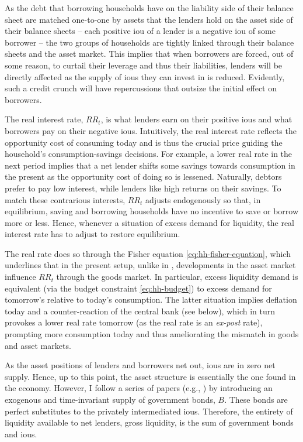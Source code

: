 \documentclass[a4paper,12pt]{article} %
\numberwithin{equation}{section} %
\numberwithin{figure}{section}
\numberwithin{table}{section}
\begin{document}
As the debt that borrowing households have on the liability side of their balance sheet are matched one-to-one by assets that the lenders hold on the asset side of their balance sheets -- each positive \Gls{iou} of a lender is a negative \Gls{iou} of some borrower -- the two groups of households are tightly linked through their balance sheets and the asset market. This implies that when borrowers are forced, out of some reason, to curtail their leverage and thus their liabilities, lenders will be directly affected as the supply of \Gls{iou}s they can invest in is reduced. Evidently, such a credit crunch will have repercussions that outsize the initial effect on borrowers.

The real interest rate, $RR_t$, is what lenders earn on their positive \Gls{iou}s and what borrowers pay on their negative \Gls{iou}s. Intuitively, the real interest rate reflects the opportunity cost of consuming today and is thus the crucial price guiding the household's consumption-savings decisions. For example, a lower real rate in the next period implies that a net lender shifts some savings towards consumption in the present as the opportunity cost of doing so is lessened. Naturally, debtors prefer to pay low interest, while lenders like high returns on their savings. To match these contrarious interests, $RR_t$ adjusts endogenously so that, in equilibrium, saving and borrowing households have no incentive to save or borrow more or less. Hence, whenever a situation of excess demand for liquidity, the real interest rate has to adjust to restore equilibrium.

The real rate does so through the Fisher equation \eqref{eq:hh-fisher-equation}, which underlines that in the present setup, unlike in \textcite{gl2017}, developments in the asset market influence $RR_t$ through the goods market. In particular, excess liquidity demand is equivalent (via the budget constraint \eqref{eq:hh-budget}) to excess demand for tomorrow's relative to today's consumption. The latter situation implies deflation today and a counter-reaction of the central bank (see below), which in turn provokes a lower real rate tomorrow (as the real rate is an \textit{ex-post} rate), prompting more consumption today and thus ameliorating the mismatch in goods and asset markets. 

As the asset positions of lenders and borrowers net out, \Gls{iou}s are in zero net supply. Hence, up to this point, the asset structure is essentially the one found in the \textcite{huggett1993} economy. However, I follow a series of papers (e.g.\cite{gl2017}, \cite{bayer2023}) by introducing an exogenous and time-invariant supply of government bonds, $B$. These bonds are perfect substitutes to the privately intermediated \Gls{iou}s. Therefore, the entirety of liquidity available to net lenders, gross liquidity, is the sum of government bonds and \Gls{iou}s.
\end{document}
